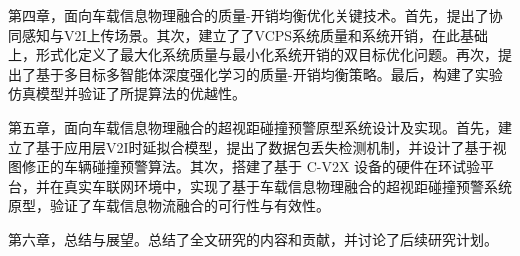 第四章，面向车载信息物理融合的质量-开销均衡优化关键技术。首先，提出了协同感知与V2I上传场景。其次，建立了了VCPS系统质量和系统开销，在此基础上，形式化定义了最大化系统质量与最小化系统开销的双目标优化问题。再次，提出了基于多目标多智能体深度强化学习的质量-开销均衡策略。最后，构建了实验仿真模型并验证了所提算法的优越性。

第五章，面向车载信息物理融合的超视距碰撞预警原型系统设计及实现。首先，建立了基于应用层V2I时延拟合模型，提出了数据包丢失检测机制，并设计了基于视图修正的车辆碰撞预警算法。其次，搭建了基于 C-V2X 设备的硬件在环试验平台，并在真实车联网环境中，实现了基于车载信息物理融合的超视距碰撞预警系统原型，验证了车载信息物流融合的可行性与有效性。

第六章，总结与展望。总结了全文研究的内容和贡献，并讨论了后续研究计划。







